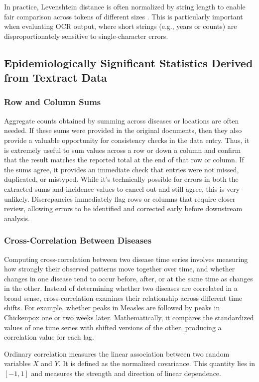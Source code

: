 \documentclass[12pt]{article}
\begin{document}
\cite{wagner1974string} In practice, Levenshtein distance is often normalized by string length to enable fair comparison across tokens of different sizes \cite{Wagner1974}. This is particularly important when evaluating OCR output, where short strings (e.g., years or counts) are disproportionately sensitive to single-character errors.


\subsection{Epidemiologically Significant Statistics Derived from Textract Data}

\subsubsection{Row and Column Sums}
Aggregate counts obtained by summing across diseases or locations are often needed.  If these sums were provided in the original documents, then they also provide a valuable opportunity for consistency checks in the data entry. Thus, it is extremely useful to sum values across a row or down a column and confirm that the result matches the reported total at the end of that row or column. If the sums agree, it provides an immediate check that entries were not missed, duplicated, or mistyped. While it’s technically possible for errors in both the extracted sums and incidence values to cancel out and still agree, this is very unlikely. Discrepancies immediately flag rows or columns that require closer review, allowing errors to be identified and corrected early before downstream analysis.

\subsubsection{Cross-Correlation Between Diseases}
Computing cross-correlation between two disease time series involves measuring how strongly their observed patterns move together over time, and whether changes in one disease tend to occur before, after, or at the same time as changes in the other. Instead of determining whether two diseases are correlated in a broad sense, cross-correlation
examines their relationship across different time shifts. For example, whether peaks in Measles are followed by peaks in Chickenpox one or two weeks later. Mathematically, it compares the standardized values of one time series with shifted versions of the other, producing a correlation value for each lag.

Ordinary correlation measures the linear association between two random variables $X$ and $Y$. 
It is defined as the normalized covariance.
This quantity lies in $[-1,1]$ and measures the strength and direction of linear dependence.
\end{document}
